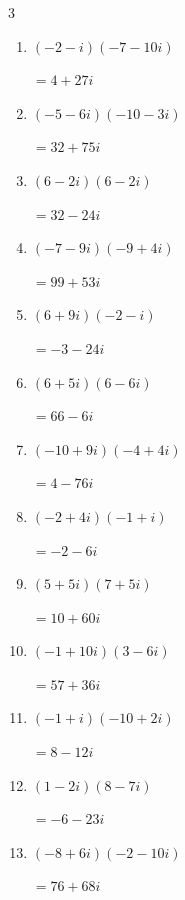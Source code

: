 \begin{multicols}{3}
\begin{enumerate}
        $\displaystyle =-74+44i$

  \item $\displaystyle (-2-i)(-7-10i)$

        $\displaystyle =4+27i$

  \item $\displaystyle (-5-6i)(-10-3i)$

        $\displaystyle =32+75i$

  \item $\displaystyle (6-2i)(6-2i)$

        $\displaystyle =32-24i$

  \item $\displaystyle (-7-9i)(-9+4i)$

        $\displaystyle =99+53i$

  \item $\displaystyle (6+9i)(-2-i)$

        $\displaystyle =-3-24i$

  \item $\displaystyle (6+5i)(6-6i)$

        $\displaystyle =66-6i$

\columnbreak %

  \item $\displaystyle (-10+9i)(-4+4i)$

        $\displaystyle =4-76i$

  \item $\displaystyle (-2+4i)(-1+i)$

        $\displaystyle =-2-6i$

  \item $\displaystyle (5+5i)(7+5i)$

        $\displaystyle =10+60i$

  \item $\displaystyle (-1+10i)(3-6i)$

        $\displaystyle =57+36i$

  \item $\displaystyle (-1+i)(-10+2i)$

        $\displaystyle =8-12i$

  \item $\displaystyle (1-2i)(8-7i)$

        $\displaystyle =-6-23i$

  \item $\displaystyle (-8+6i)(-2-10i)$

        $\displaystyle =76+68i$


\end{enumerate}
\end{multicols}
